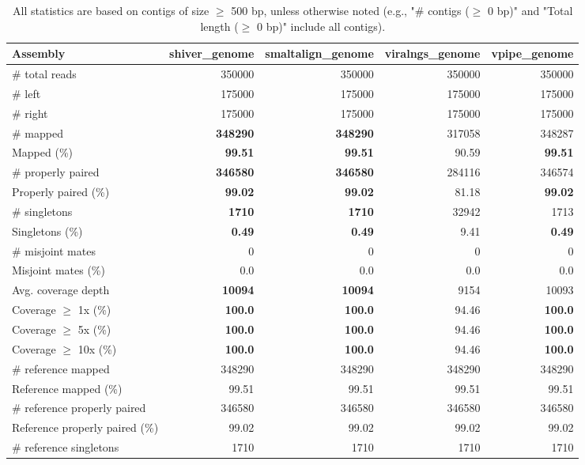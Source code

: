 \documentclass[12pt,a4paper]{article}
\begin{document}
\begin{table}[ht]
\begin{center}
\caption{All statistics are based on contigs of size $\geq$ 500 bp, unless otherwise noted (e.g., "\# contigs ($\geq$ 0 bp)" and "Total length ($\geq$ 0 bp)" include all contigs).}
\begin{tabular}{|l*{4}{|r}|}
\hline
Assembly & shiver\_genome & smaltalign\_genome & viralngs\_genome & vpipe\_genome \\ \hline
\# total reads & 350000 & 350000 & 350000 & 350000 \\ \hline
\# left & 175000 & 175000 & 175000 & 175000 \\ \hline
\# right & 175000 & 175000 & 175000 & 175000 \\ \hline
\# mapped & {\bf 348290} & {\bf 348290} & 317058 & 348287 \\ \hline
Mapped (\%) & {\bf 99.51} & {\bf 99.51} & 90.59 & {\bf 99.51} \\ \hline
\# properly paired & {\bf 346580} & {\bf 346580} & 284116 & 346574 \\ \hline
Properly paired (\%) & {\bf 99.02} & {\bf 99.02} & 81.18 & {\bf 99.02} \\ \hline
\# singletons & {\bf 1710} & {\bf 1710} & 32942 & 1713 \\ \hline
Singletons (\%) & {\bf 0.49} & {\bf 0.49} & 9.41 & {\bf 0.49} \\ \hline
\# misjoint mates & 0 & 0 & 0 & 0 \\ \hline
Misjoint mates (\%) & 0.0 & 0.0 & 0.0 & 0.0 \\ \hline
Avg. coverage depth & {\bf 10094} & {\bf 10094} & 9154 & 10093 \\ \hline
Coverage $\geq$ 1x (\%) & {\bf 100.0} & {\bf 100.0} & 94.46 & {\bf 100.0} \\ \hline
Coverage $\geq$ 5x (\%) & {\bf 100.0} & {\bf 100.0} & 94.46 & {\bf 100.0} \\ \hline
Coverage $\geq$ 10x (\%) & {\bf 100.0} & {\bf 100.0} & 94.46 & {\bf 100.0} \\ \hline
\# reference mapped & 348290 & 348290 & 348290 & 348290 \\ \hline
Reference mapped (\%) & 99.51 & 99.51 & 99.51 & 99.51 \\ \hline
\# reference properly paired & 346580 & 346580 & 346580 & 346580 \\ \hline
Reference properly paired (\%) & 99.02 & 99.02 & 99.02 & 99.02 \\ \hline
\# reference singletons & 1710 & 1710 & 1710 & 1710 \\ \hline

\end{tabular}
\end{center}
\end{table}
\end{document}
